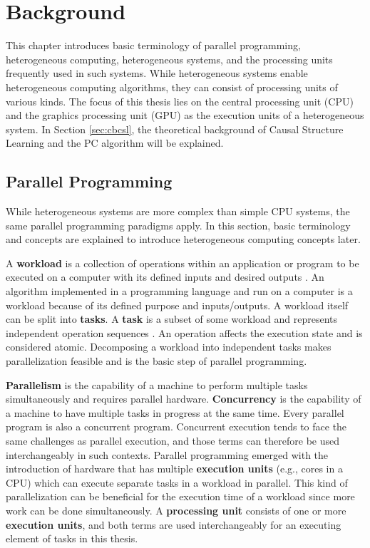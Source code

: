 \chapter{Background}
\label{chap:background}
This chapter introduces basic terminology of parallel programming, heterogeneous computing, heterogeneous systems, and the processing units frequently used in such systems. While heterogeneous systems enable heterogeneous computing algorithms, they can consist of processing units of various kinds. The focus of this thesis lies on the central processing unit (CPU) and the graphics processing unit (GPU) as the execution units of a heterogeneous system.
In Section \ref{sec:cbcsl}, the theoretical background of Causal Structure Learning and the PC algorithm will be explained.

\section{Parallel Programming}
While heterogeneous systems are more complex than simple CPU systems, the same parallel programming paradigms apply. In this section, basic terminology and concepts are explained to introduce heterogeneous computing concepts later.

A \textbf{workload} is a collection of operations within an application or program to be executed on a computer with its defined inputs and desired outputs \cite{pfisterSearchClusters1998}. An algorithm implemented in a programming language and run on a computer is a workload because of its defined purpose and inputs/outputs. A workload itself can be split into \textbf{tasks}. A \textbf{task} is a subset of some workload and represents independent operation sequences \cite{breshearsArtConcurrencyThread2009}. An operation affects the execution state and is considered atomic. Decomposing a workload into independent tasks makes parallelization feasible and is the basic step of parallel programming.

\textbf{Parallelism} is the capability of a machine to perform multiple tasks simultaneously and requires parallel hardware. \textbf{Concurrency} is the capability of a machine to have multiple tasks in progress at the same time. Every parallel program is also a concurrent program. Concurrent execution tends to face the same challenges as parallel execution, and those terms can therefore be used interchangeably in such contexts. Parallel programming emerged with the introduction of hardware that has multiple \textbf{execution units} (e.g., cores in a CPU) \cite{mattsonPatternsParallelProgramming2004} which can execute separate tasks in a workload in parallel. This kind of parallelization can be beneficial for the execution time of a workload since more work can be done simultaneously. A \textbf{processing unit} consists of one or more \textbf{execution units}, and both terms are used interchangeably for an executing element of tasks in this thesis.

